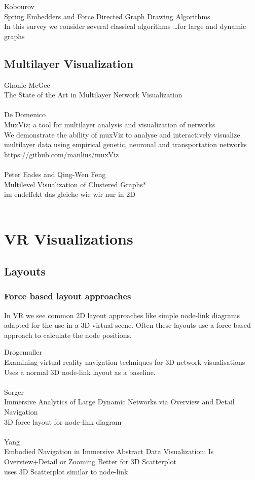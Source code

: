 Kobourov\\
Spring Embedders and Force Directed Graph Drawing Algorithms\\
In this survey we consider several classical algorithms \dots for large and dynamic graphs
\subsection{Multilayer Visualization}
Ghonie McGee\\
The State of the Art in Multilayer Network Visualization\\
\\
De Domenico\\
MuxViz: a tool for multilayer analysis and visualization of networks\\
We demonstrate the ability of muxViz to analyse and interactively visualize multilayer data using empirical genetic, neuronal and transportation networks https://github.com/manlius/muxViz\\
\\
Peter Eades and Qing-Wen Feng\\
Multilevel Visualization of Clustered Graphs*\\
im endeffekt das gleiche wie wir nur in 2D\\
\\

\section{VR Visualizations}

\subsection{Layouts}

\subsubsection{Force based layout approaches}
In VR we see common 2D layout approaches like simple node-link diagrams adapted for the use in a 3D virtual scene. Often these layouts use a force based approach to calculate the node positions. 

Drogemuller\\
Examining virtual reality navigation techniques for 3D network visualisations\\
Uses a normal 3D node-link layout as a baseline.\\
\\
Sorger\\
Immersive Analytics of Large Dynamic Networks via Overview and Detail Navigation\\
3D force layout for node-link diagram\\
\\
Yang\\
Embodied Navigation in Immersive Abstract Data Visualization:
Is Overview+Detail or Zooming Better for 3D Scatterplot\\
uses 3D Scatterplot similar to node-link
